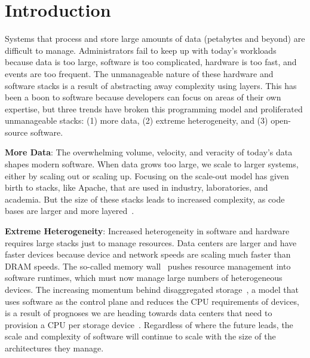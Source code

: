 \chapter{Introduction}

Systems that process and store large amounts of data (petabytes and beyond) are
difficult to manage. Administrators fail to keep up with today's workloads
because data is too large, software is too complicated, hardware is too fast,
and events are too frequent. The unmanageable nature of these hardware and
software stacks is a result of abstracting away complexity using layers. This
has been a boon to software because developers can focus on areas of their own
expertise, but three trends have broken this programming model and proliferated
unmanageable stacks: (1) more data, (2) extreme heterogeneity, and (3)
open-source software. 

\textbf{More Data}: The overwhelming volume, velocity, and veracity of today's
data shapes modern software. When data grows too large, we scale to larger
systems, either by scaling out or scaling up. Focusing on the scale-out model
has given birth to stacks, like Apache, that are used in industry,
laboratories, and academia. But the size of these stacks leads to increased
complexity, as code bases are larger and more
layered~\cite{sevilla:eurosys17-malacology}.

\textbf{Extreme Heterogeneity}: Increased heterogeneity in software and
hardware requires large stacks just to manage resources.  Data centers are
larger and have faster devices because device and network speeds are scaling
much faster than DRAM speeds. The so-called memory
wall~\cite{wulf:sigarch1995-memory-wall} pushes resource management into
software runtimes, which must now manage large numbers of heterogeneous
devices. The increasing momentum behind disaggregated
storage~\cite{klimovic:asplos2017-reflex, klimovic:eurosys16-disagg}, a model
that uses software as the control plane and reduces the CPU requirements of
devices, is a result of prognoses we are heading towards data centers that need
to provision a CPU per storage device~\cite{samuels:oss16}. Regardless of where
the future leads, the scale and complexity of software will continue to scale
with the size of the architectures they manage.

